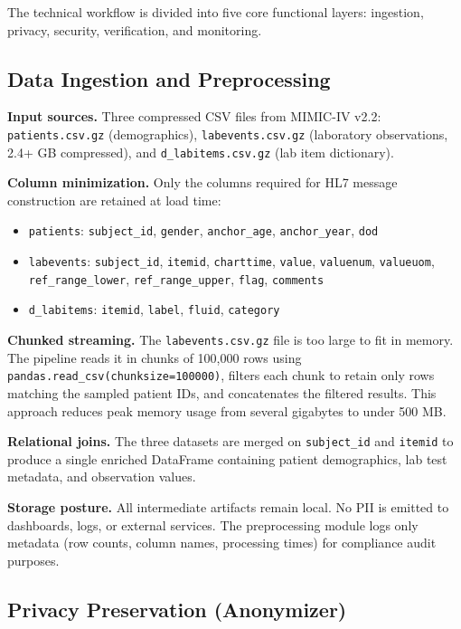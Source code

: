 \documentclass[12pt,a4paper]{report}
\begin{document}
The technical workflow is divided into five core functional layers: ingestion, privacy, 
security, verification, and monitoring.

\subsection{Data Ingestion and Preprocessing}

\textbf{Input sources.} Three compressed CSV files from MIMIC-IV v2.2:
\texttt{patients.csv.gz} (demographics), \texttt{labevents.csv.gz} (laboratory
observations, 2.4+ GB compressed), and \texttt{d\_labitems.csv.gz} (lab item
dictionary).

\textbf{Column minimization.} Only the columns required for HL7 message construction
are retained at load time:
\begin{itemize}
    \item \texttt{patients}: \texttt{subject\_id}, \texttt{gender},
    \texttt{anchor\_age}, \texttt{anchor\_year}, \texttt{dod}
    \item \texttt{labevents}: \texttt{subject\_id}, \texttt{itemid},
    \texttt{charttime}, \texttt{value}, \texttt{valuenum}, \texttt{valueuom},
    \texttt{ref\_range\_lower}, \texttt{ref\_range\_upper}, \texttt{flag},
    \texttt{comments}
    \item \texttt{d\_labitems}: \texttt{itemid}, \texttt{label}, \texttt{fluid},
    \texttt{category}
\end{itemize}

\textbf{Chunked streaming.} The \texttt{labevents.csv.gz} file is too large to fit
in memory. The pipeline reads it in chunks of 100,000 rows using
\texttt{pandas.read\_csv(chunksize=100000)}, filters each chunk to retain only rows
matching the sampled patient IDs, and concatenates the filtered results. This approach
reduces peak memory usage from several gigabytes to under 500 MB.

\textbf{Relational joins.} The three datasets are merged on \texttt{subject\_id} and
\texttt{itemid} to produce a single enriched DataFrame containing patient demographics,
lab test metadata, and observation values.

\textbf{Storage posture.} All intermediate artifacts remain local. No PII is emitted to
dashboards, logs, or external services. The preprocessing module logs only metadata
(row counts, column names, processing times) for compliance audit purposes.

\subsection{Privacy Preservation (Anonymizer)}
\end{document}
